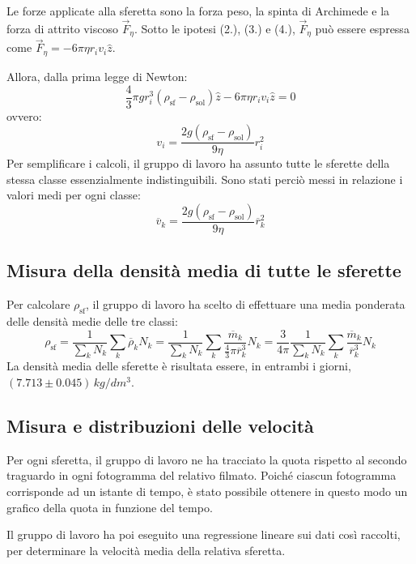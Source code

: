 \documentclass{article}
\begin{document}
\vspace{2mm}

Le forze applicate alla sferetta sono la forza peso, la spinta di Archimede
e la forza di attrito viscoso $\vec{F}_\eta$.
Sotto le ipotesi (2.), (3.) e (4.), $\vec{F}_\eta$ può essere espressa come
$\vec{F}_\eta = -6\pi\eta r_i v_i\hat{z}$.

Allora, dalla prima legge di Newton:
\[
  \frac{4}{3}\pi g r_i^3 (\rho_\text{sf} - \rho_\text{sol}) \hat{z}
  -6\pi\eta r_i v_i\hat{z} = 0
\]
ovvero:
\[
  v_i = \frac{2g(\rho_\text{sf} - \rho_\text{sol})}{9\eta} r_i^2
\]
Per semplificare i calcoli, il gruppo di lavoro ha assunto tutte le sferette
della stessa classe essenzialmente indistinguibili. Sono stati perciò messi
in relazione i valori medi per ogni classe: \[
  \overline{v}_k = \frac{2g(\rho_\text{sf} - \rho_\text{sol})}{9\eta}
  \overline{r}_k^2
\]

\subsection{Misura della densità media di tutte le sferette}
Per calcolare $\rho_\text{sf}$, il gruppo di lavoro ha scelto di
effettuare una media ponderata delle densità medie delle tre classi:
\[
  \rho_\text{sf} = \frac{1}{\sum_k N_k} \sum_k \overline{\rho}_k N_k
    = \frac{1}{\sum_k N_k} \sum_k \frac{\overline{m}_k}{
      \frac{4}{3}\pi \overline{r}_k^3} N_k
    = \frac{3}{4\pi} \frac{1}{\sum_k N_k} \sum_k \frac{\overline{m}_k}{
      \overline{r}_k^3} N_k
\]
La densità media delle sferette è risultata essere,
in entrambi i giorni, $(7.713\pm0.045)\,\unit{kg \per dm^3}$.

\subsection{Misura e distribuzioni delle velocità}
Per ogni sferetta, il gruppo di lavoro ne ha tracciato la quota
rispetto al secondo traguardo in ogni fotogramma del relativo filmato.
Poiché ciascun fotogramma corrisponde ad un istante di tempo,
è stato possibile ottenere in questo modo un grafico della quota
in funzione del tempo.

Il gruppo di lavoro ha poi eseguito una regressione lineare sui dati così
raccolti, per determinare la velocità media della relativa sferetta.
\end{document}
